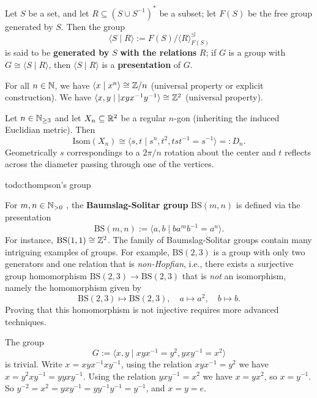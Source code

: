 \begin{definition}[]
    Let $S$ be a set, and let $R \subseteq (S \cup  S^{-1})^*$ be a subset; let $F(S)$ be the free group generated by $S$. Then the group \[
        \langle S \mid R \rangle := F(S) / \langle R \rangle ^{\trianglelefteq }_{F(S)}
    \] is said to be \textbf{generated by} $S$ \textbf{with the relations} $R$; if $G$ is a group with $G \cong  \langle S\mid R \rangle $, then $\langle S \mid R \rangle $ is a \textbf{presentation} of $G$.
\end{definition}
\begin{example}
    For all $n \in \mathbb{N}$, we have $\langle x\mid x^n  \rangle \cong \mathbb{Z} /n$ (universal property or explicit construction). We have $\langle x,y \mid |xyx^{-1}y^{-1} \rangle \cong \mathbb{Z}^2$ (universal property).
\end{example}
\begin{example}
    Let $n \in \mathbb{N} _{\geq 3}$ and let $X_n  \subseteq \mathbb{R}^2$ be a regular $n$-gon (inheriting the induced Euclidian metric). Then \[
        \mathrm{Isom}(X_n ) \cong \langle s,t \mid s^n , t^2, tst^{-1}=s^{-1} \rangle =: D_n .
    \] Geometrically $s$ correspondings to a  $2\pi / n$ rotation about the center and $t$ reflects across the diameter passing through one of the vertices.
\end{example}
{\color{red}todo:thompson's group} 
\begin{example}
    For $m,n \in \mathbb{N} _{>0}$ , the \textbf{Baumslag-Solitar group} $\mathrm{BS}(m,n)$ is defined via the presentation 
    \[
    \mathrm{BS}(m,n) := \langle a,b \mid  b a^m b^{-1} = a^n  \rangle .
\] For instance, $\mathrm{BS}(1,1) \cong  \mathbb{Z}^2$. The family of Baumslag-Solitar groups contain many intriguing examples of groups. For example, $\mathrm{BS}(2,3)$ is a group with only two generators and one relation that is \emph{non-Hopfian}, i.e., there exists a surjective group homomorphism $\mathrm{BS}(2,3) \to \mathrm{BS}(2,3)$ that is \emph{not} an isomorphism, namely the homomorphism given by \[
\mathrm{BS}(2,3) \mapsto  \mathrm{BS}(2,3), \quad a \mapsto a^2, \quad b\mapsto b.
\] Proving that this homomorphism is not injective requires more advanced techniques.
\end{example}
\begin{example}
    The group \[
    G:= \langle x, y \mid xyx^{-1} = y^2, yxy^{-1} = x^2 \rangle 
    \] is trivial. Write $x = xyx ^{-1} x y^{-1}$, using the relation $xyx ^{-1} = y^2$ we have $x= y^2 x y^{-1}= yyxy^{-1}$. Using the relation $yxy^{-1}=x^2$ we have $x=yx^2$, so $x =y ^{-1}$. So $y ^{-2}=x^2=yxy^{-1}=yy^{-1}y^{-1}=y^{-1}$, and $x=y=e$.
\end{example}
